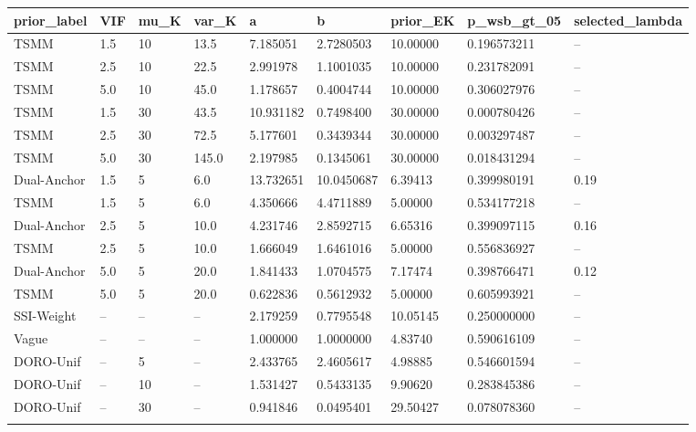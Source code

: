 \begin{longtable}{lllllllll}
\toprule
prior\_label & VIF & mu\_K & var\_K & a & b & prior\_EK & p\_wsb\_gt\_05 & selected\_lambda \\
\midrule\endhead
TSMM & 1.5 & 10 & 13.5 & 7.185051 & 2.7280503 & 10.00000 & 0.196573211 & -- \\ \addlinespace[3pt]
TSMM & 2.5 & 10 & 22.5 & 2.991978 & 1.1001035 & 10.00000 & 0.231782091 & -- \\ \addlinespace[3pt]
TSMM & 5.0 & 10 & 45.0 & 1.178657 & 0.4004744 & 10.00000 & 0.306027976 & -- \\ \addlinespace[3pt]
TSMM & 1.5 & 30 & 43.5 & 10.931182 & 0.7498400 & 30.00000 & 0.000780426 & -- \\ \addlinespace[3pt]
TSMM & 2.5 & 30 & 72.5 & 5.177601 & 0.3439344 & 30.00000 & 0.003297487 & -- \\ \addlinespace[3pt]
TSMM & 5.0 & 30 & 145.0 & 2.197985 & 0.1345061 & 30.00000 & 0.018431294 & -- \\ \addlinespace[3pt]
Dual-Anchor & 1.5 & 5 & 6.0 & 13.732651 & 10.0450687 & 6.39413 & 0.399980191 & 0.19 \\ \addlinespace[3pt]
TSMM & 1.5 & 5 & 6.0 & 4.350666 & 4.4711889 & 5.00000 & 0.534177218 & -- \\ \addlinespace[3pt]
Dual-Anchor & 2.5 & 5 & 10.0 & 4.231746 & 2.8592715 & 6.65316 & 0.399097115 & 0.16 \\ \addlinespace[3pt]
TSMM & 2.5 & 5 & 10.0 & 1.666049 & 1.6461016 & 5.00000 & 0.556836927 & -- \\ \addlinespace[3pt]
Dual-Anchor & 5.0 & 5 & 20.0 & 1.841433 & 1.0704575 & 7.17474 & 0.398766471 & 0.12 \\ \addlinespace[3pt]
TSMM & 5.0 & 5 & 20.0 & 0.622836 & 0.5612932 & 5.00000 & 0.605993921 & -- \\ \addlinespace[3pt]
SSI-Weight & -- & -- & -- & 2.179259 & 0.7795548 & 10.05145 & 0.250000000 & -- \\ \addlinespace[3pt]
Vague & -- & -- & -- & 1.000000 & 1.0000000 & 4.83740 & 0.590616109 & -- \\ \addlinespace[3pt]
DORO-Unif & -- & 5 & -- & 2.433765 & 2.4605617 & 4.98885 & 0.546601594 & -- \\ \addlinespace[3pt]
DORO-Unif & -- & 10 & -- & 1.531427 & 0.5433135 & 9.90620 & 0.283845386 & -- \\ \addlinespace[3pt]
DORO-Unif & -- & 30 & -- & 0.941846 & 0.0495401 & 29.50427 & 0.078078360 & -- \\ \addlinespace[3pt]
\bottomrule\end{longtable}
